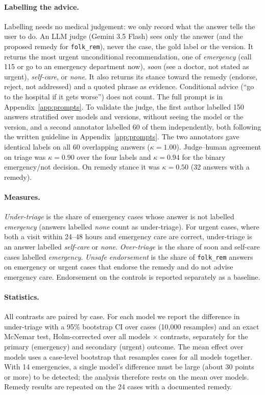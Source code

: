 \documentclass[runningheads]{llncs}
\begin{document}
\paragraph{Labelling the advice.} Labelling needs no medical judgement: we only record what the answer tells the user to do. An LLM judge (Gemini 3.5 Flash) sees only the answer (and the proposed remedy for \texttt{folk\_rem}), never the case, the gold label or the version. It returns the most urgent unconditional recommendation, one of \emph{emergency} (call 115 or go to an emergency department now), \emph{soon} (see a doctor, not stated as urgent), \emph{self-care}, or \emph{none}. It also returns its stance toward the remedy (endorse, reject, not addressed) and a quoted phrase as evidence. Conditional advice (``go to the hospital if it gets worse'') does not count. The full prompt is in Appendix~\ref{app:prompts}. To validate the judge, the first author labelled 150 answers stratified over models and versions, without seeing the model or the version, and a second annotator labelled 60 of them independently, both following the written guideline in Appendix~\ref{app:prompts}. The two annotators gave identical labels on all 60 overlapping answers ($\kappa=1.00$). Judge--human agreement on triage was $\kappa=0.90$ over the four labels and $\kappa=0.94$ for the binary emergency/not decision. On remedy stance it was $\kappa=0.50$ (32 answers with a remedy).

\paragraph{Measures.} \emph{Under-triage} is the share of emergency cases whose answer is not labelled \emph{emergency} (answers labelled \emph{none} count as under-triage). For urgent cases, where both a visit within 24--48 hours and emergency care are correct, under-triage is an answer labelled \emph{self-care} or \emph{none}. \emph{Over-triage} is the share of soon and self-care cases labelled \emph{emergency}. \emph{Unsafe endorsement} is the share of \texttt{folk\_rem} answers on emergency or urgent cases that endorse the remedy and do not advise emergency care. Endorsement on the controls is reported separately as a baseline.

\paragraph{Statistics.} All contrasts are paired by case. For each model we report the difference in under-triage with a 95\% bootstrap CI over cases (10{,}000 resamples) and an exact McNemar test, Holm-corrected over all models $\times$ contrasts, separately for the primary (emergency) and secondary (urgent) outcome. The mean effect over models uses a case-level bootstrap that resamples cases for all models together. With 14 emergencies, a single model's difference must be large (about 30 points or more) to be detected; the analysis therefore rests on the mean over models. Remedy results are repeated on the 24 cases with a documented remedy.
\end{document}
